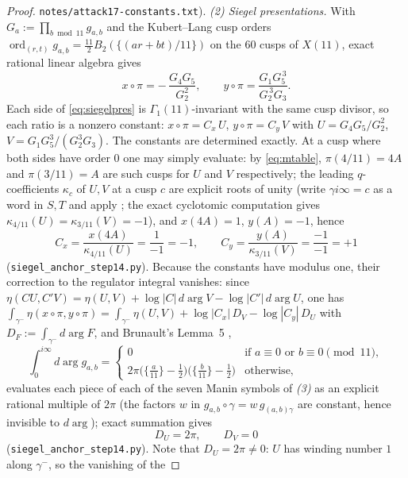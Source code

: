 \documentclass[11pt]{amsart}
\theoremstyle{definition}
\theoremstyle{remark}
\begin{document}
\begin{proof}
\texttt{notes/attack17-constants.txt}).
\emph{(2) Siegel presentations.}  With
$G_a:=\prod_{b\bmod 11}g_{a,b}$ and the Kubert--Lang cusp orders
$\operatorname{ord}_{(r,t)}g_{a,b}=\tfrac{11}{2}B_2(\{(ar+bt)/11\})$ on the
$60$ cusps of $X(11)$, exact rational linear algebra gives
\begin{equation}\label{eq:siegelpres}
  x\circ\pi=-\,\frac{G_4G_5}{G_2^2},
  \qquad
  y\circ\pi=\frac{G_1G_5^{\,3}}{G_2^{\,3}G_3}.
\end{equation}
Each side of \eqref{eq:siegelpres} is $\Gamma_1(11)$-invariant with the
same cusp divisor, so each ratio is a nonzero constant:
$x\circ\pi=C_x\,U$, $y\circ\pi=C_y\,V$ with $U=G_4G_5/G_2^2$,
$V=G_1G_5^3/(G_2^3G_3)$.  The constants are determined exactly.  At a
cusp where both sides have order $0$ one may simply evaluate: by
\eqref{eq:mtable}, $\pi(4/11)=4A$ and $\pi(3/11)=A$ are such cusps for
$U$ and $V$ respectively; the leading $q$-coefficients $\kappa_c$ of
$U,V$ at a cusp $c$ are explicit roots of unity (write
$\gamma i\infty=c$ as a word in $S,T$ and apply
\cite[Lemma~4 and eq.~(3)]{BrunaultSiegel}; the exact cyclotomic
computation gives $\kappa_{4/11}(U)=\kappa_{3/11}(V)=-1$), and
$x(4A)=1$, $y(A)=-1$, hence
\[
  C_x=\frac{x(4A)}{\kappa_{4/11}(U)}=\frac{1}{-1}=-1,\qquad
  C_y=\frac{y(A)}{\kappa_{3/11}(V)}=\frac{-1}{-1}=+1
\]
(\texttt{siegel\_anchor\_step14.py}).  Because the constants have modulus
one, their correction to the regulator integral vanishes: since
$\eta(CU,C'V)=\eta(U,V)+\log|C|\,d\!\arg V-\log|C'|\,d\!\arg U$, one has
$\int_{\gamma^-}\eta(x\circ\pi,y\circ\pi)=\int_{\gamma^-}\eta(U,V)
 +\log|C_x|\,D_V-\log|C_y|\,D_U$ with $D_F:=\int_{\gamma^-}d\!\arg F$,
and Brunault's Lemma~5 \cite{BrunaultSiegel},
\[
  \int_0^{i\infty}d\!\arg g_{a,b}=
  \begin{cases}
    0 & \text{if }a\equiv0\text{ or }b\equiv0\pmod{11},\\[1mm]
    2\pi\bigl(\{\tfrac{a}{11}\}-\tfrac12\bigr)
        \bigl(\{\tfrac{b}{11}\}-\tfrac12\bigr) & \text{otherwise},
  \end{cases}
\]
evaluates each piece of each of the seven Manin symbols of \emph{(3)} as
an explicit rational multiple of $2\pi$ (the factors $w$ in
$g_{a,b}\circ\gamma=w\,g_{(a,b)\gamma}$ are constant, hence invisible to
$d\!\arg$); exact summation gives
\begin{equation}\label{eq:DUDV}
  D_U=2\pi,\qquad D_V=0
\end{equation}
(\texttt{siegel\_anchor\_step14.py}).  Note that $D_U=2\pi\neq0$: $U$
has winding number $1$ along $\gamma^-$, so the vanishing of the

\end{proof}
\end{document}
